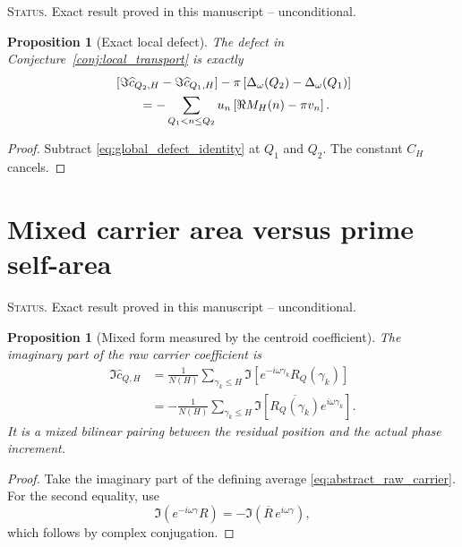 \documentclass[11pt]{amsart}
\numberwithin{equation}{section}
\theoremstyle{plain}
\newtheorem{proposition}[theorem]{Proposition}
\theoremstyle{definition}
\theoremstyle{remark}
\newcommand{\1}{\mathbf{1}}
\newcommand{\statusnote}[1]{%
  \par\smallskip\noindent
  \begingroup\footnotesize\textsc{Status.} #1\endgroup
  \par\smallskip}
\begin{document}
\statusnote{Exact result proved in this manuscript -- unconditional.}
\begin{proposition}[Exact local defect]
\label{prop:local_defect}
The defect in Conjecture~\ref{conj:local_transport} is exactly
\begin{align}
&
\left[
\Im\widehat c_{Q_2,H}-\Im\widehat c_{Q_1,H}
\right]
-
\pi\left[
\Delta_\omega(Q_2)-\Delta_\omega(Q_1)
\right]
\notag
\\
&\qquad
=
-\sum_{Q_1<n\leq Q_2}
u_n\left[
\Re M_H(n)-\pi v_n
\right].
\label{eq:local_defect_identity}
\end{align}
\end{proposition}

\begin{proof}
Subtract \eqref{eq:global_defect_identity} at \(Q_1\) and \(Q_2\).
The constant \(C_H\) cancels.
\end{proof}

\section{Mixed carrier area versus prime self-area}
\label{sec:mixed_vs_self_area}

\statusnote{Exact result proved in this manuscript -- unconditional.}
\begin{proposition}[Mixed form measured by the centroid coefficient]
\label{prop:mixed_area}
The imaginary part of the raw carrier coefficient is
\begin{align}
\Im\widehat c_{Q,H}
&=
\frac1{N(H)}
\sum_{\gamma_k\leq H}
\Im\left[
e^{-i\omega\gamma_k}R_Q(\gamma_k)
\right]
\label{eq:mixed_area_first}
\\
&=
-\frac1{N(H)}
\sum_{\gamma_k\leq H}
\Im\left[
\overline{R_Q(\gamma_k)}
e^{i\omega\gamma_k}
\right].
\label{eq:mixed_area_second}
\end{align}
It is a mixed bilinear pairing between the residual position and the
actual phase increment.
\end{proposition}

\begin{proof}
Take the imaginary part of the defining average
\eqref{eq:abstract_raw_carrier}.  For the second equality, use
\begin{equation}
\Im(e^{-i\omega\gamma}R)
=
-\Im(\overline R\,e^{i\omega\gamma}),
\label{eq:mixed_area_conjugation}
\end{equation}
which follows by complex conjugation.
\end{proof}
\end{document}
